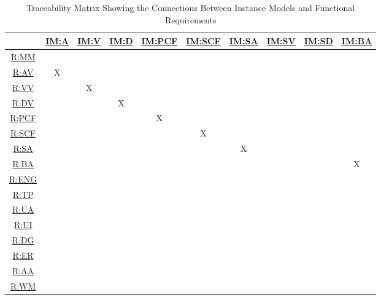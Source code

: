 \documentclass[12pt]{article}
\newcommand{\hpref}[1]{\hyperref[#1]{#1}}
\begin{document}
\begin{table}[h!]
\centering
\begin{tabular}{|c|c|c|c|c|c|c|c|c|c|}
\hline
	& \hpref{IM:A} & \hpref{IM:V}& \hpref{IM:D} & \hpref{IM:PCF} & \hpref{IM:SCF} & \hpref{IM:SA}& \hpref{IM:SV}& \hpref{IM:SD}& \hpref{IM:BA}\\
\hline

\hpref{R:MM}         & & & & & & & & &  \\ \hline
\hpref{R:AV}         &X& & & & & & & &  \\ \hline
\hpref{R:VV}         & &X& & & & & & &  \\ \hline
\hpref{R:DV}         & & &X& & & & & &  \\ \hline
\hpref{R:PCF}        & & & &X& & & & &  \\ \hline
\hpref{R:SCF}        & & & & &X& & & &  \\ \hline
\hpref{R:SA}         & & & & & &X& & &  \\ \hline
\hpref{R:BA}         & & & & & & & & &X  \\ \hline
\hpref{R:ENG}        & & & & & & & & & \\ \hline
\hpref{R:TP}         & & & & & & & & &  \\ \hline
\hpref{R:UA}         & & & & & & & & &  \\ \hline
\hpref{R:UI}         & & & & & & & & &  \\ \hline
\hpref{R:DG}         & & & & & & & & &  \\ \hline
\hpref{R:ER}         & & & & & & & & &  \\ \hline
\hpref{R:AA}         & & & & & & & & &  \\ \hline
\hpref{R:WM}         & & & & & & & & &  \\ \hline
\end{tabular}
\caption{Traceability Matrix Showing the Connections Between Instance Models and Functional Requirements}
\label{Table:trace_requirements}
\end{table}
\end{document}

